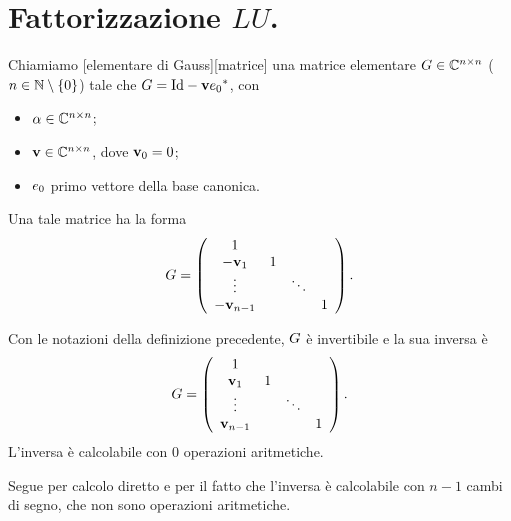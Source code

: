\section{Fattorizzazione $LU$.}
\label{MetodiNumericiPerLaRisoluzioneDiSistemiLineari_FattorizzazioneLU}
\begin{Definition}
  Chiamiamo
  [elementare di Gauss][matrice]
  una matrice elementare
  $G \in \mathbb{C}^{n \times n}$
  ($n \in \mathbb{N} \setminus \lbrace 0 \rbrace$)
  tale che
  $\GaussElementaryMatrix
  = \Identity - \Vector\HermitianTransposed{\CanonicalBase_0}$, con
  \begin{itemize}
    \item $\alpha \in \mathbb{C}^{n \times n}$;
    \item $\mathbf{v} \in \mathbb{C}^{n \times n}$, dove $\mathbf{v}_0 = 0$;
    \item $e_0$ primo vettore della base canonica.
  \end{itemize}
  Una tale matrice ha la forma
  \[
    G =
    \left (
    \begin{array}{cccc}
      1                 &   &         &   \\
      - \mathbf{v}_1       & 1 &         &   \\
      \vdots            &   & \ddots  &   \\
      - \mathbf{v}_{n - 1} &   &         & 1 \\
    \end{array}
    \right ).
  \]
\end{Definition}
\begin{Theorem}
  Con le notazioni della definizione precedente,
  $G$ \`e invertibile e la sua inversa \`e
  \[
    G =
    \left (
    \begin{array}{cccc}
      1                 &   &         &   \\
      \mathbf{v}_1         & 1 &         &   \\
      \vdots            &   & \ddots  &   \\
      \mathbf{v}_{n - 1}   &   &         & 1 \\
    \end{array}
    \right ).
  \]
  L'inversa \`e calcolabile con $0$ operazioni aritmetiche.
\end{Theorem}
\Proof Segue per calcolo diretto e per il fatto che l'inversa \`e calcolabile
con $n - 1$ cambi di segno, che non sono operazioni aritmetiche. \EndProof
